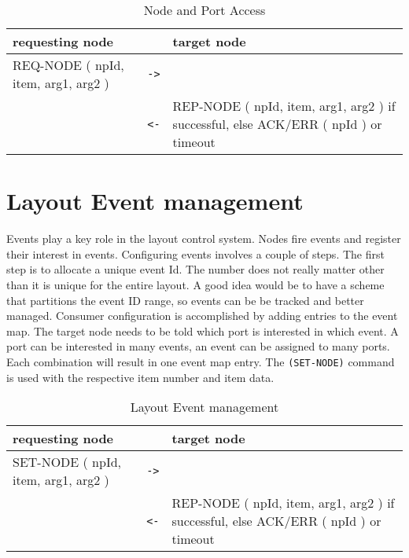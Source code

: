\begin{table}[ht!]
    \begin{center}
        \caption{Node and Port Access}
        \begin{tabular}{|p{} c p{}|}
            \toprule
            \textbf{requesting node} & & \textbf{ target node} \\
            \midrule
            REQ-NODE ( npId, item, arg1, arg2 ) & \texttt{->} &  \\
            \midrule
            & \texttt{<-} & REP-NODE ( npId, item, arg1, arg2 ) if successful, else ACK/ERR ( npId ) or timeout \\
            \bottomrule
        \end{tabular}
    \end{center}
\end{table}


\section{Layout Event management}

Events play a key role in the layout control system. Nodes fire events and register their interest in events. Configuring events involves a couple of steps. The first step is to allocate a unique event Id. The number does not really matter other than it is unique for the entire layout. A good idea would be to have a scheme that partitions the event ID range, so events can be be tracked and better managed. Consumer configuration is accomplished by adding entries to the event map. The target node needs to be told which port is interested in which event. A port can be interested in many events, an event can be assigned to many ports. Each combination will result in one event map entry. The \texttt{(SET-NODE)} command is used with the respective item number and item data.

\begin{table}[ht!]
    \begin{center}
        \caption{Layout Event management}
        \begin{tabular}{|p{} c p{}|}
            \toprule
            \textbf{requesting node} & & \textbf{ target node} \\
            \midrule
            SET-NODE ( npId, item, arg1, arg2 ) & \texttt{->} &  \\
            \midrule
            & \texttt{<-} & REP-NODE ( npId, item, arg1, arg2 ) if successful, else ACK/ERR ( npId ) or timeout \\
            \bottomrule
        \end{tabular}
    \end{center}
\end{table}

